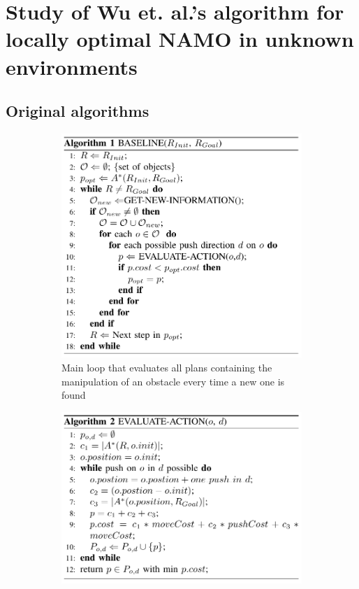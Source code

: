 
\chapter{Study of Wu et. al.'s algorithm for locally optimal NAMO in unknown environments} %

\label{Chapter3} %

\section{Original algorithms}

\begin{figure}[H]
\centering
\begin{subfigure}{.5\textwidth}
  \centering
  \includegraphics[width=\linewidth]{Figures/Wu_Original_Algorithm/algo1.png}
  \caption{Main loop that evaluates all plans containing the manipulation of an obstacle every time a new one is found}
  \label{fig:Wu_Original_Algorithm-algo1}
\end{subfigure}%
\begin{subfigure}{.5\textwidth}
  \centering
  \includegraphics[width=\linewidth]{Figures/Wu_Original_Algorithm/algo2.png}

\end{subfigure}
\end{figure}
